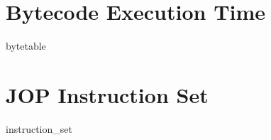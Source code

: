 



\chapter{Bytecode Execution Time}
{bytetable}

\chapter{JOP Instruction Set} \label{appx:jop:instr}
{instruction_set}


